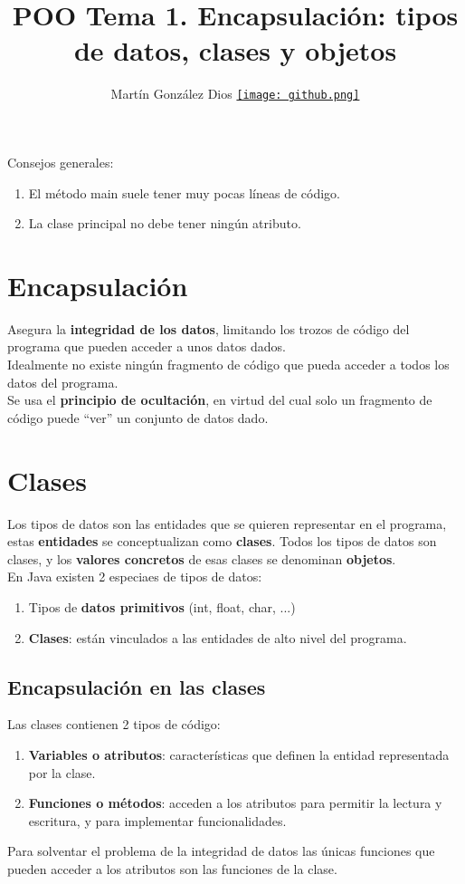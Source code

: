 \documentclass{article}
\title{POO Tema 1. Encapsulación: tipos de datos, clases y objetos}
\author{Martín González Dios 
\href{https://github.com/martindios}{\texttt{[image: github.png]}}}
\begin{document}
\maketitle

Consejos generales:
\begin{enumerate}
    \item El método main suele tener muy pocas líneas de código.
    \item La clase principal no debe tener ningún atributo.
\end{enumerate}

\section{Encapsulación}
Asegura la \textbf{integridad de los datos}, limitando los trozos de código del programa que pueden acceder a unos datos dados. \\
Idealmente no existe ningún fragmento de código que pueda acceder a todos los datos del programa. \\
Se usa el \textbf{principio de ocultación}, en virtud del cual solo un fragmento de código puede “ver” un conjunto de datos dado.

\section{Clases}
Los tipos de datos son las entidades que se quieren representar en el programa, estas \textbf{entidades} se conceptualizan como \textbf{clases}. Todos los tipos de datos son clases, y los \textbf{valores concretos} de esas clases se denominan \textbf{objetos}. \\
En Java existen 2 especiaes de tipos de datos:
\begin{enumerate}
    \item Tipos de \textbf{datos primitivos} (int, float, char, ...)
    \item \textbf{Clases}: están vinculados a las entidades de alto nivel del programa.
\end{enumerate}

\subsection{Encapsulación en las clases}
Las clases contienen 2 tipos de código:
\begin{enumerate}
    \item \textbf{Variables o atributos}: características que definen la entidad representada por la clase.
    \item \textbf{Funciones o métodos}: acceden a los atributos para permitir la lectura y escritura, y para implementar funcionalidades.
\end{enumerate}
Para solventar el problema de la integridad de datos las únicas funciones que pueden acceder a los atributos son las funciones de la clase. \\
\end{document}
